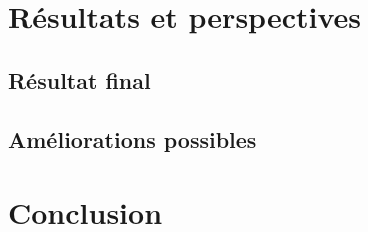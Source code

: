 \documentclass[french]{scrartcl}
\begin{document}
\newpage



\newpage



\newpage



\newpage



\newpage

\section{Résultats et perspectives}
\subsection{Résultat final}
\subsection{Améliorations possibles}

\newpage

\section{Conclusion}

\newpage


\end{document}
